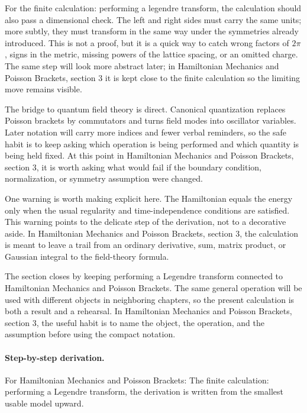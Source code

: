 For the finite calculation: performing a legendre transform, the calculation should also pass a dimensional check.  The left and right sides must carry the same units; more subtly, they must transform in the same way under the symmetries already introduced.  This is not a proof, but it is a quick way to catch wrong factors of \(2\pi\), signs in the metric, missing powers of the lattice spacing, or an omitted charge.  The same step will look more abstract later; in Hamiltonian Mechanics and Poisson Brackets, section 3 it is kept close to the finite calculation so the limiting move remains visible.

The bridge to quantum field theory is direct.  Canonical quantization replaces Poisson brackets by commutators and turns field modes into oscillator variables.  Later notation will carry more indices and fewer verbal reminders, so the safe habit is to keep asking which operation is being performed and which quantity is being held fixed.  At this point in Hamiltonian Mechanics and Poisson Brackets, section 3, it is worth asking what would fail if the boundary condition, normalization, or symmetry assumption were changed.

One warning is worth making explicit here.  The Hamiltonian equals the energy only when the usual regularity and time-independence conditions are satisfied.  This warning points to the delicate step of the derivation, not to a decorative aside.  In Hamiltonian Mechanics and Poisson Brackets, section 3, the calculation is meant to leave a trail from an ordinary derivative, sum, matrix product, or Gaussian integral to the field-theory formula.

The section closes by keeping performing a Legendre transform connected to Hamiltonian Mechanics and Poisson Brackets.  The same general operation will be used with different objects in neighboring chapters, so the present calculation is both a result and a rehearsal.  In Hamiltonian Mechanics and Poisson Brackets, section 3, the useful habit is to name the object, the operation, and the assumption before using the compact notation.



\paragraph{Step-by-step derivation.}

For Hamiltonian Mechanics and Poisson Brackets: The finite calculation: performing a Legendre transform, the derivation is written from the smallest usable model upward.

